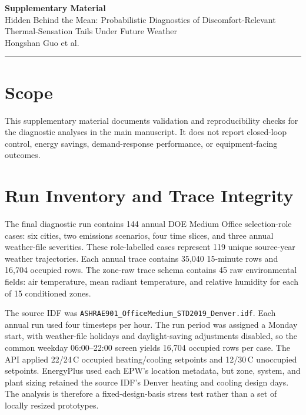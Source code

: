 \documentclass[11pt]{article}
\begin{document}
\begin{center}
{\Large\bfseries Supplementary Material}\\[0.45em]
{\large Hidden Behind the Mean: Probabilistic Diagnostics of Discomfort-Relevant Thermal-Sensation Tails Under Future Weather}\\[0.45em]
Hongshan Guo et al.
\end{center}

\vspace{0.5em}
\hrule
\vspace{0.8em}

\section{Scope}

This supplementary material documents validation and reproducibility checks for the diagnostic analyses in the main manuscript. It does not report closed-loop control, energy savings, demand-response performance, or equipment-facing outcomes.

\section{Run Inventory and Trace Integrity}

The final diagnostic run contains 144 annual DOE Medium Office selection-role cases: six cities, two emissions scenarios, four time slices, and three annual weather-file severities. These role-labelled cases represent 119 unique source-year weather trajectories. Each annual trace contains 35{,}040 15-minute rows and 16{,}704 occupied rows. The zone-raw trace schema contains 45 raw environmental fields: air temperature, mean radiant temperature, and relative humidity for each of 15 conditioned zones.

The source IDF was \texttt{ASHRAE901\_OfficeMedium\_STD2019\_Denver.idf}. Each annual run used four timesteps per hour. The run period was assigned a Monday start, with weather-file holidays and daylight-saving adjustments disabled, so the common weekday 06:00--22:00 screen yields 16{,}704 occupied rows per case. The API applied 22/24\,\degree C occupied heating/cooling setpoints and 12/30\,\degree C unoccupied setpoints. EnergyPlus used each EPW's location metadata, but zone, system, and plant sizing retained the source IDF's Denver heating and cooling design days. The analysis is therefore a fixed-design-basis stress test rather than a set of locally resized prototypes.
\end{document}
